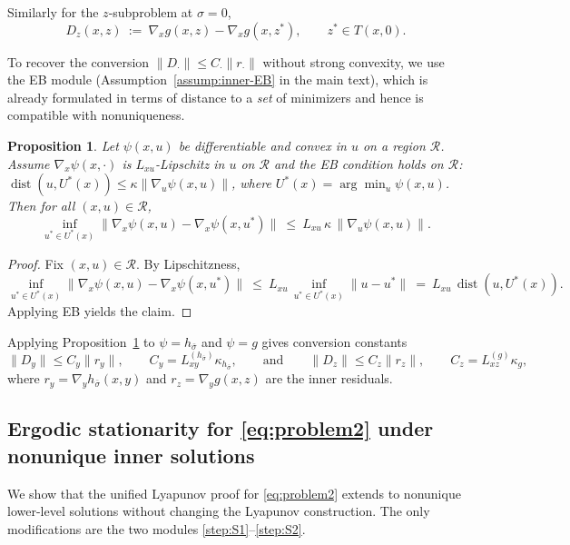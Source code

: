 \documentclass{article}
\newtheorem{proposition}[theorem]{Proposition}
\newcommand{\1}{\mathbf{1}}
\begin{document}
Similarly for the $z$-subproblem at $\sigma=0$,
\[
D_z(x,z)\ :=\ \nabla_x g(x,z)-\nabla_x g(x,z^*),\qquad z^*\in T(x,0).
\]

To recover the conversion $\|D_\cdot\|\le C_\cdot\|r_\cdot\|$ without strong convexity, we use the EB module
(Assumption~\ref{assump:inner-EB} in the main text), which is already formulated in terms of distance to a \emph{set} of minimizers
and hence is compatible with nonuniqueness.

\begin{proposition}\label{prop:EB-to-dev-nonunique}
Let $\psi(x,u)$ be differentiable and convex in $u$ on a region $\mathcal R$.
Assume $\nabla_x\psi(x,\cdot)$ is $L_{xu}$-Lipschitz in $u$ on $\mathcal R$ and the EB condition holds on $\mathcal R$:
$\operatorname{dist}(u,U^*(x))\le \kappa \|\nabla_u\psi(x,u)\|$, where $U^*(x)=\arg\min_u \psi(x,u)$.
Then for all $(x,u)\in\mathcal R$,
\[
\inf_{u^*\in U^*(x)}\|\nabla_x\psi(x,u)-\nabla_x\psi(x,u^*)\|
\ \le\ L_{xu}\,\kappa\,\|\nabla_u\psi(x,u)\|.
\]
\end{proposition}

\begin{proof}
Fix $(x,u)\in\mathcal R$. By Lipschitzness,
\[
\inf_{u^*\in U^*(x)}\|\nabla_x\psi(x,u)-\nabla_x\psi(x,u^*)\|
\ \le\ L_{xu}\,\inf_{u^*\in U^*(x)}\|u-u^*\|
\ =\ L_{xu}\,\operatorname{dist}(u,U^*(x)).
\]
Applying EB yields the claim.
\end{proof}

Applying Proposition~\ref{prop:EB-to-dev-nonunique} to $\psi=h_{\bar\sigma}$ and $\psi=g$ gives conversion constants
\[
\|D_y\|\le C_y\|r_y\|,\qquad C_y=L_{x y}^{(h_{\bar\sigma})}\kappa_{h_{\bar\sigma}},
\qquad\text{and}\qquad
\|D_z\|\le C_z\|r_z\|,\qquad C_z=L_{xz}^{(g)}\kappa_g,
\]
where $r_y=\nabla_y h_{\bar\sigma}(x,y)$ and $r_z=\nabla_y g(x,z)$ are the inner residuals.

\subsection{Ergodic stationarity for \ref{eq:problem2} under nonunique inner solutions}\label{app:nonunique-ergodic}
We show that the unified Lyapunov proof for \ref{eq:problem2} extends to nonunique lower-level solutions
without changing the Lyapunov construction.
The only modifications are the two modules \ref{step:S1}--\ref{step:S2}.
\end{document}
